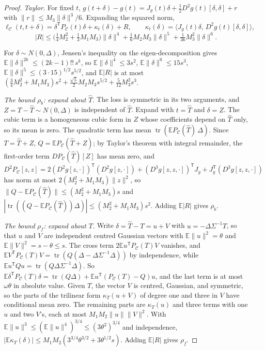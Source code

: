\documentclass[11pt,onecolumn]{IEEEtran}
\newcommand{\E}{\mathbb{E}}
\newcommand{\tr}{\operatorname{tr}}
\newcommand{\PC}{P_{\mathcal C}}
\begin{document}
\begin{proof}
\emph{Taylor.} For fixed $t$,
$g(t+\delta)-g(t)=J_g(t)\delta+\tfrac12D^2g(t)[\delta,\delta]+r$
with $\|r\|\le M_3\|\delta\|^3/6$. Expanding the squared norm,
\[
\ell_{\mathcal C}(t,t+\delta)=\delta^{\mathsf T}\PC(t)\delta+\kappa_t(\delta)+R,\qquad
\kappa_t(\delta)=\bigl\langle J_g(t)\delta,\,D^2g(t)[\delta,\delta]\bigr\rangle,
\]
\[
|R|\le\bigl(\tfrac14M_2^2+\tfrac13M_1M_3\bigr)\|\delta\|^4+\tfrac16M_2M_3\|\delta\|^5+\tfrac1{36}M_3^2\|\delta\|^6 .
\]

For $\delta\sim N(0,\Delta)$, Jensen's inequality on the eigen-decomposition gives
$\E\|\delta\|^{2k}\le(2k-1)!!\,s^k$, so $\E\|\delta\|^4\le3s^2$,
$\E\|\delta\|^6\le15s^3$, $\E\|\delta\|^5\le(3\cdot15)^{1/2}s^{5/2}$, and $\E|R|$ is at
most $(\tfrac34M_2^2+M_1M_3)s^2+\tfrac{\sqrt5}2M_2M_3s^{5/2}+\tfrac5{12}M_3^2s^3$.

\emph{The bound $\rho_b$: expand about $\hat T$.} The loss is symmetric in its two
arguments, and $Z=T-\hat T\sim N(0,\Delta)$ is independent of $\hat T$. Expand with
$t=\hat T$ and $\delta=Z$. The cubic term is a homogeneous cubic form in $Z$ whose
coefficients depend on $\hat T$ only, so its mean is zero. The quadratic term has mean
$\tr(\E\PC(\hat T)\,\Delta)$. Since $T=\hat T+Z$, $Q=\E\PC(\hat T+Z)$; by Taylor's theorem
with integral remainder, the first-order term $D\PC(\hat T)[Z]$ has mean zero, and
$D^2\PC[z,z]=2(D^2g[z,\cdot])^{\mathsf T}(D^2g[z,\cdot])
+(D^3g[z,z,\cdot])^{\mathsf T}J_g+J_g^{\mathsf T}(D^3g[z,z,\cdot])$ has norm at
most $2(M_2^2+M_1M_3)\|z\|^2$, so $\|Q-\E\PC(\hat T)\|\le(M_2^2+M_1M_3)s$ and
$|\tr((Q-\E\PC(\hat T))\Delta)|\le(M_2^2+M_1M_3)s^2$. Adding $\E|R|$ gives $\rho_b$.

\emph{The bound $\rho_f$: expand about $T$.} Write $\delta=\hat T-T=u+V$ with
$u=-\Delta\Sigma^{-1}T$, so that $u$ and $V$ are independent centred Gaussian vectors
with $\E\|u\|^2=\theta$ and $\E\|V\|^2=s-\theta\le s$. The cross term
$2\E u^{\mathsf T}\PC(T)V$ vanishes, and
$\E V^{\mathsf T}\PC(T)V=\tr(Q(\Delta-\Delta\Sigma^{-1}\Delta))$ by independence, while
$\E u^{\mathsf T}Qu=\tr(Q\Delta\Sigma^{-1}\Delta)$. So
$\E\delta^{\mathsf T}\PC(T)\delta=\tr(Q\Delta)+\E u^{\mathsf T}(\PC(T)-Q)u$, and the last
term is at most $\omega\theta$ in absolute value. Given $T$, the vector $V$ is centred, Gaussian, and symmetric,
so the parts of the trilinear form $\kappa_T(u+V)$ of degree one and three in $V$ have
conditional mean zero. The remaining parts are $\kappa_T(u)$ and three terms with one
$u$ and two $V$'s, each at most $M_1M_2\|u\|\|V\|^2$. With
$\E\|u\|^3\le(\E\|u\|^4)^{3/4}\le(3\theta^2)^{3/4}$ and independence,
$|\E\kappa_T(\delta)|\le M_1M_2(3^{3/4}\theta^{3/2}+3\theta^{1/2}s)$. Adding $\E|R|$ gives
$\rho_f$.
\end{proof}
\end{document}
